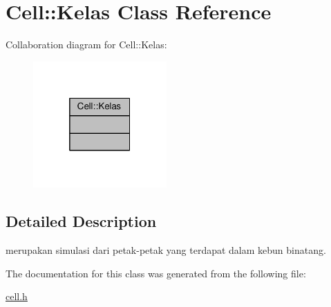 \hypertarget{classCell_1_1Kelas}{}\section{Cell\+:\+:Kelas Class Reference}
\label{classCell_1_1Kelas}


Collaboration diagram for Cell\+:\+:Kelas\+:
\nopagebreak
\begin{figure}[H]
\begin{center}
\leavevmode
\includegraphics[width=145pt]{classCell_1_1Kelas__coll__graph}
\end{center}
\end{figure}


\subsection{Detailed Description}
merupakan simulasi dari petak-\/petak yang terdapat dalam kebun binatang. 

The documentation for this class was generated from the following file\+:\begin{DoxyCompactItemize}
\item 
\hyperlink{cell_8h}{cell.\+h}\end{DoxyCompactItemize}
